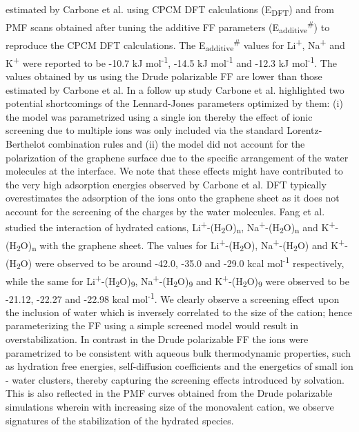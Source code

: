 estimated by Carbone et al. using CPCM DFT calculations (E\textsubscript{DFT}) and from PMF scans obtained after tuning the additive FF parameters (E\textsubscript{additive}\textsuperscript{\#}) to reproduce the CPCM DFT calculations. The E\textsubscript{additive}\textsuperscript{\#} values for Li\textsuperscript{+}, Na\textsuperscript{+} and K\textsuperscript{+} were reported to be -10.7 kJ mol\textsuperscript{-1}, -14.5 kJ mol\textsuperscript{-1} and -12.3 kJ mol\textsuperscript{-1}. The values obtained by us using the Drude polarizable FF are lower than those estimated by Carbone et al. In a follow up study Carbone et al. highlighted two potential shortcomings of the Lennard-Jones parameters optimized by them: (i) the model was parametrized using a single ion thereby the effect of ionic screening due to multiple ions was only included via the standard Lorentz-Berthelot combination rules and (ii) the model did not account for the polarization of the graphene surface due to the specific arrangement of the water molecules at the interface.\supercite{elliott_qmmd_2020} We note that these effects might have contributed to the very high adsorption energies observed by Carbone et al. DFT typically overestimates the adsorption of the ions onto the graphene sheet as it does not account for the screening of the charges by the water molecules. Fang et al. studied the interaction of hydrated cations, Li\textsuperscript{+}-(H\textsubscript{2}O)\textsubscript{n}, Na\textsuperscript{+}-(H\textsubscript{2}O)\textsubscript{n} and K\textsuperscript{+}-(H\textsubscript{2}O)\textsubscript{n} with the graphene sheet.\supercite{mu_hydrated_2021} The values for Li\textsuperscript{+}-(H\textsubscript{2}O), Na\textsuperscript{+}-(H\textsubscript{2}O) and K\textsuperscript{+}-(H\textsubscript{2}O) were observed to be around -42.0, -35.0 and -29.0 kcal mol\textsuperscript{-1} respectively, while the same for Li\textsuperscript{+}-(H\textsubscript{2}O)\textsubscript{9}, Na\textsuperscript{+}-(H\textsubscript{2}O)\textsubscript{9} and K\textsuperscript{+}-(H\textsubscript{2}O)\textsubscript{9} were observed to be -21.12, -22.27 and -22.98 kcal mol\textsuperscript{-1}. We clearly observe a screening effect upon the inclusion of water which is inversely correlated to the size of the cation; hence parameterizing the FF using a simple screened model would result in overstabilization.\supercite{mu_hydrated_2021} In contrast in the Drude polarizable FF the ions were parametrized to be consistent with aqueous bulk thermodynamic properties, such as hydration free energies, self-diffusion coefficients and the energetics of small ion - water clusters, thereby capturing the screening effects introduced by solvation.\supercite{yu_simulating_2010} This is also reflected in the PMF curves obtained from the Drude polarizable simulations wherein with increasing size of the monovalent cation, we observe signatures of the stabilization of the hydrated species.

